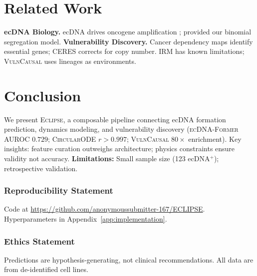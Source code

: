 \documentclass{article}
\newcommand{\eclipse}{\textsc{Eclipse}}
\newcommand{\former}{\textsc{ecDNA-Former}}
\newcommand{\circularode}{\textsc{CircularODE}}
\newcommand{\vulncausal}{\textsc{VulnCausal}}
\begin{document}
\section{Related Work}
\label{sec:related}

\textbf{ecDNA Biology.} ecDNA drives oncogene amplification \citep{turner_2017_ecdna, verhaak_2019_ecdna_review}; \citet{lange_2022_mathematical} provided our binomial segregation model. \textbf{Vulnerability Discovery.} Cancer dependency maps \citep{tsherniak_2017_depmap, behan_2019_prioritization} identify essential genes; CERES \citep{meyers_2017_ceres} corrects for copy number. IRM \citep{arjovsky_2019_irm} has known limitations; \vulncausal{} uses lineages as environments.


\section{Conclusion}
\label{sec:conclusion}

We present \eclipse{}, a composable pipeline connecting ecDNA formation prediction, dynamics modeling, and vulnerability discovery (\former{} AUROC $0.729$; \circularode{} $r > 0.997$; \vulncausal{} $80\times$ enrichment). Key insights: feature curation outweighs architecture; physics constraints ensure validity not accuracy. \textbf{Limitations:} Small sample size (123 ecDNA$^+$); retrospective validation.


\subsubsection*{Reproducibility Statement}
Code at \url{https://github.com/anonymoussubmitter-167/ECLIPSE}. Hyperparameters in Appendix~\ref{app:implementation}.

\subsubsection*{Ethics Statement}
Predictions are hypothesis-generating, not clinical recommendations. All data are from de-identified cell lines.




\end{document}
